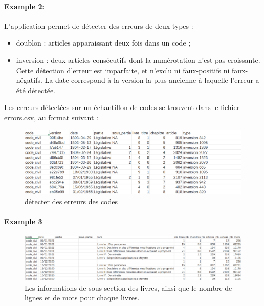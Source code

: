 \documentclass[
  oneside]{book}
\providecommand{\tightlist}{%
  \setlength{\itemsep}{0pt}\setlength{\parskip}{0pt}}
\begin{document}
\hypertarget{example-2}{%
\paragraph{Example 2:}\label{example-2}}

L'application permet de détecter des erreurs de deux types :

\begin{itemize}
\tightlist
\item
  doublon : articles apparaissant deux fois dans un code ;
\item
  inversion : deux articles consécutifs dont la numérotation n'est pas croissante.
  Cette détection d'erreur est imparfaite, et n'exclu ni faux-positifs ni faux-négatifs. La date correspond à la version la plus ancienne à laquelle l'erreur a été détectée.
\end{itemize}

Les erreurs détectées sur un échantillon de codes se trouvent dans le fichier errors.csv, au format suivant :

\begin{figure}

{\centering \includegraphics[width=0.8\linewidth]{images/check} 

}

\caption{détecter des erreurs des codes}\label{fig:check}
\end{figure}

\hypertarget{example-3}{%
\paragraph{Example 3}\label{example-3}}

\begin{figure}

{\centering \includegraphics[width=0.8\linewidth]{images/stats3} 

}

\caption{Les informations de sous-section des livres, ainsi que le nombre de lignes et de mots pour chaque livres.}\label{fig:stats3}
\end{figure}
\end{document}
